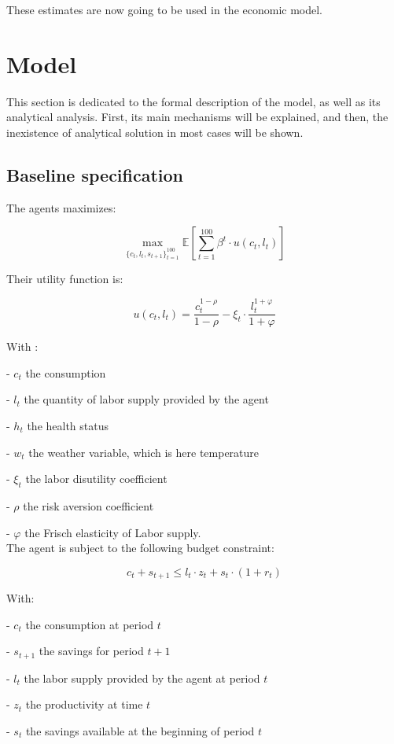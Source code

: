 \documentclass{article}
\begin{document}
These estimates are now going to be used in 
the economic model.

\section{Model}

This section is dedicated to the formal description of 
the model, as well as its analytical analysis.
First, its main mechanisms will be explained, and then, the 
inexistence of analytical solution in most cases will be shown.

\subsection{Baseline specification }

The agents maximizes: 

$$ \max_{\{c_{t},l_{t},s_{t+1}\}_{t=1}^{100}}{\mathbb{E}\left[\sum_{t=1}^{100} \beta^{t}\cdot u(c_t,l_t)\right]}$$

Their utility function is: 

$$u(c_{t},l_{t}) = \frac{c_{t}^{1-\rho}}{1-\rho}-\xi_{t}\cdot \frac{l_{t}^{1+\varphi}}{1+\varphi}$$

With : 

-  $c_{t}$  the consumption

-  $l_{t}$  the quantity of labor supply provided by the agent

-  $h_{t}$  the health status

-  $w_{t}$  the weather variable, which is here temperature

-  $\xi_{t}$ the labor disutility coefficient

- $\rho$ the risk aversion coefficient

- $\varphi$ the Frisch elasticity of Labor supply.
\\

The agent is subject to the following budget constraint:

$$c_{t} + s_{t+1} \leq l_{t}\cdot z_{t} + s_{t}\cdot(1+r_{t})$$

With: 

-  $c_t$ the consumption at period $t$

-  $s_{t+1}$ the savings for period $t+1$

-  $l_t$ the labor supply provided by the agent at period $t$

-  $z_t$ the productivity at time $t$

-  $s_{t}$ the savings available at the beginning of period $t$
\end{document}
